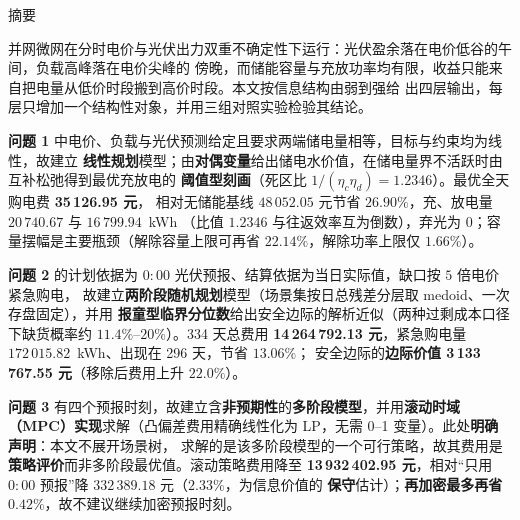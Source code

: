 {\linespread{1.35}\selectfont
\begin{center}
  {\heiti \papertitle\par}
\end{center}

\begin{center}
  {\heiti 摘\quad 要}
\end{center}

并网微网在分时电价与光伏出力双重不确定性下运行：光伏盈余落在电价低谷的午间，负载高峰落在电价尖峰的
傍晚，而储能容量与充放功率均有限，收益只能来自把电量从低价时段搬到高价时段。本文按信息结构由弱到强给
出四层输出，每层只增加一个结构性对象，并用三组对照实验检验其结论。

\textbf{问题 1} 中电价、负载与光伏预测给定且要求两端储电量相等，目标与约束均为线性，故建立
\textbf{线性规划}模型；由\textbf{对偶变量}给出储电水价值，在储电量界不活跃时由互补松弛得到最优充放电的
\textbf{阈值型刻画}（死区比 \(1/(\eta_c\eta_d)=1.2346\)）。最优全天购电费 \textbf{35\,126.95 元}，
相对无储能基线 \(48\,052.05\) 元节省 \(26.90\%\)，充、放电量 \(20\,740.67\) 与 \(16\,799.94\)~kWh
（比值 \(1.2346\) 与往返效率互为倒数），弃光为 0；容量摆幅是主要瓶颈（解除容量上限可再省
\(22.14\%\)，解除功率上限仅 \(1.66\%\)）。

\textbf{问题 2} 的计划依据为 \(0{:}00\) 光伏预报、结算依据为当日实际值，缺口按 \(5\) 倍电价紧急购电，
故建立\textbf{两阶段随机规划}模型（场景集按日总残差分层取 medoid、一次存盘固定），并用
\textbf{报童型临界分位数}给出安全边际的解析近似（两种过剩成本口径下缺货概率约 \(11.4\%\)--\(20\%\)）。334 天总费用
\textbf{14\,264\,792.13 元}，紧急购电量 \(172\,015.82\)~kWh、出现在 296 天，节省 \(13.06\%\)；
安全边际的\textbf{边际价值 3\,133\,767.55 元}（移除后费用上升 \(22.0\%\)）。

\textbf{问题 3} 有四个预报时刻，故建立含\textbf{非预期性}的\textbf{多阶段模型}，并用\textbf{滚动时域
（MPC）实现}求解（凸偏差费用精确线性化为 LP，无需 0--1 变量）。此处\textbf{明确声明}：本文不展开场景树，
求解的是该多阶段模型的一个可行策略，故其费用是\textbf{策略评价}而非多阶段最优值。滚动策略费用降至
\textbf{13\,932\,402.95 元}，相对“只用 \(0{:}00\) 预报”降 \(332\,389.18\) 元（\(2.33\%\)，为信息价值的
\textbf{保守}估计）；\textbf{再加密最多再省 \(0.42\%\)}，故不建议继续加密预报时刻。

}
